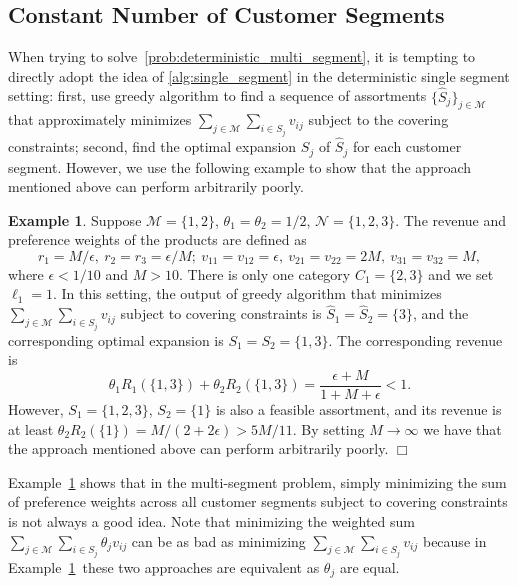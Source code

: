 \documentclass[msom,non-blindrev]{informs3} %
\theoremstyle{definition}
\newtheorem{example}[theorem]{Example}
\begin{document}
\subsection{Constant Number of Customer Segments}
When trying to solve~\eqref{prob:deterministic_multi_segment}, it is tempting to directly adopt the idea of \cref{alg:single_segment} in the deterministic single segment setting: first, use greedy algorithm to find a sequence of assortments $\{\hat{S}_j\}_{j\in\mathcal{M}}$ that approximately minimizes $\sum_{j\in\mathcal{M}}\sum_{i\in S_j}v_{ij}$  subject to the covering constraints; second, find the optimal expansion $S_j$ of $\hat{S}_j$ for each customer segment. However, we use the following example to show that the approach mentioned above can perform arbitrarily poorly.

\begin{example}\label{example:multi_segment}
Suppose $\mathcal{M}=\{1,2\}$, $\theta_1=\theta_2=1/2$, $\mathcal{N}=\{1,2,3\}$. The revenue and preference weights of the products are defined as
\begin{equation*}
r_1=M/\epsilon,\ r_2=r_3=\epsilon/M;\ v_{11}=v_{12}=\epsilon,\ v_{21}=v_{22}=2M,\ v_{31}=v_{32}=M,
\end{equation*}
where $\epsilon<1/10$ and $M>10$. There is only one category $C_1=\{2,3\}$ and we set $\ell_1=1$. In this setting, the output of greedy algorithm that minimizes $\sum_{j\in\mathcal{M}}\sum_{i\in S_j}v_{ij}$ subject to covering constraints is $\hat{S}_1=\hat{S}_2=\{3\}$, and the corresponding optimal expansion is $S_1=S_2=\{1,3\}$. The corresponding revenue is
\begin{equation*}
\theta_1R_1(\{1,3\})+\theta_2R_2(\{1,3\})=\dfrac{\epsilon+M}{1+M+\epsilon}<1.
\end{equation*}
However, $S_1=\{1,2,3\}$, $S_2=\{1\}$ is also a feasible assortment, and its revenue is at least $\theta_2R_2(\{1\})=M/(2+2\epsilon)>5M/11$. By setting $M\to\infty$ we have that the approach mentioned above can perform arbitrarily poorly. \hfill$\Box$
\end{example}

Example~\ref{example:multi_segment} shows that in the multi-segment problem, simply minimizing the sum of preference weights across all customer segments subject to covering constraints is not always a good idea. Note that minimizing the weighted sum  $\sum_{j\in\mathcal{M}}\sum_{i\in S_j}\theta_jv_{ij}$ can be as bad as minimizing $\sum_{j\in\mathcal{M}}\sum_{i\in S_j}v_{ij}$ because in Example~\ref{example:multi_segment}~these two approaches are equivalent as $\theta_j$ are equal. %
\end{document}
